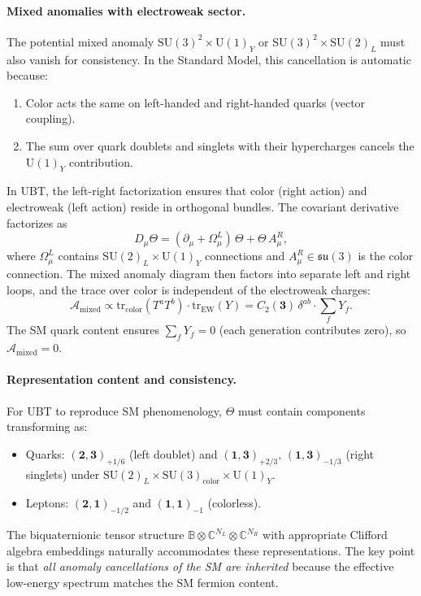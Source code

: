 \paragraph{Mixed anomalies with electroweak sector.}
The potential mixed anomaly $\mathrm{SU}(3)^2 \times \mathrm{U}(1)_Y$ or $\mathrm{SU}(3)^2 \times \mathrm{SU}(2)_L$ must also vanish for consistency. In the Standard Model, this cancellation is automatic because:
\begin{enumerate}
\item Color acts the same on left-handed and right-handed quarks (vector coupling).
\item The sum over quark doublets and singlets with their hypercharges cancels the $\mathrm{U}(1)_Y$ contribution.
\end{enumerate}
In UBT, the left-right factorization ensures that color (right action) and electroweak (left action) reside in orthogonal bundles. The covariant derivative factorizes as
\begin{equation}
D_\mu \Theta = (\partial_\mu + \Omega_\mu^L)\,\Theta + \Theta\,A_\mu^R,
\end{equation}
where $\Omega_\mu^L$ contains $\mathrm{SU}(2)_L \times \mathrm{U}(1)_Y$ connections and $A_\mu^R \in \mathfrak{su}(3)$ is the color connection. The mixed anomaly diagram then factors into separate left and right loops, and the trace over color is independent of the electroweak charges:
\begin{equation}
\mathcal{A}_{\mathrm{mixed}} \propto \mathrm{tr}_{\mathrm{color}}(T^a T^b) \cdot \mathrm{tr}_{\mathrm{EW}}(Y) = C_2(\mathbf{3})\,\delta^{ab} \cdot \sum_f Y_f.
\end{equation}
The SM quark content ensures $\sum_f Y_f = 0$ (each generation contributes zero), so $\mathcal{A}_{\mathrm{mixed}}=0$.

\paragraph{Representation content and consistency.}
For UBT to reproduce SM phenomenology, $\Theta$ must contain components transforming as:
\begin{itemize}
\item Quarks: $(\mathbf{2},\mathbf{3})_{+1/6}$ (left doublet) and $(\mathbf{1},\mathbf{3})_{+2/3},\,(\mathbf{1},\mathbf{3})_{-1/3}$ (right singlets) under $\mathrm{SU}(2)_L \times \mathrm{SU}(3)_{\mathrm{color}} \times \mathrm{U}(1)_Y$.
\item Leptons: $(\mathbf{2},\mathbf{1})_{-1/2}$ and $(\mathbf{1},\mathbf{1})_{-1}$ (colorless).
\end{itemize}
The biquaternionic tensor structure $\mathbb{B}\otimes \mathbb{C}^{N_L}\otimes \mathbb{C}^{N_R}$ with appropriate Clifford algebra embeddings naturally accommodates these representations. The key point is that \emph{all anomaly cancellations of the SM are inherited} because the effective low-energy spectrum matches the SM fermion content.

